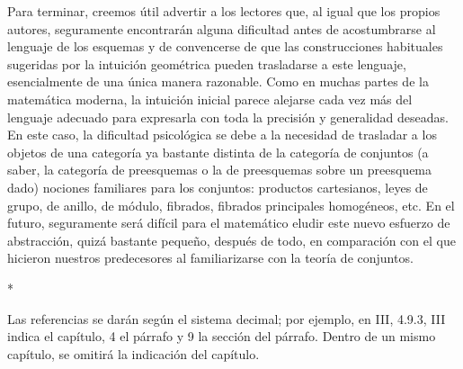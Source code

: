 Para terminar, creemos útil advertir a los lectores que, al igual que los propios autores, seguramente encontrarán alguna dificultad antes de acostumbrarse al lenguaje de los esquemas y de convencerse de que las construcciones habituales sugeridas por la intuición geométrica pueden trasladarse a este lenguaje, esencialmente de una única manera razonable.
Como en muchas partes de la matemática moderna, la intuición inicial parece alejarse cada vez más del lenguaje adecuado para expresarla con toda la precisión y generalidad deseadas.
En este caso, la dificultad psicológica se debe a la necesidad de trasladar a los objetos de una categoría ya bastante distinta de la categoría de conjuntos (a saber, la categoría de preesquemas o la de preesquemas sobre un preesquema dado) nociones familiares para los conjuntos: productos cartesianos, leyes de grupo, de anillo, de módulo, fibrados, fibrados principales homogéneos, etc.
En el futuro, seguramente será difícil para el matemático eludir este nuevo esfuerzo de abstracción, quizá bastante pequeño, después de todo, en comparación con el que hicieron nuestros predecesores al familiarizarse con la teoría de conjuntos.

\bigskip
\begin{center}*\quad*\quad*\end{center}
\bigskip

Las referencias se darán según el sistema decimal; por ejemplo, en III, 4.9.3, III indica el capítulo, 4 el párrafo y 9 la sección del párrafo.
Dentro de un mismo capítulo, se omitirá la indicación del capítulo.
